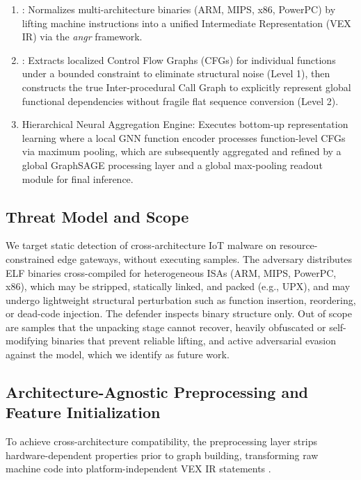 \documentclass[conference]{IEEEtran}
\begin{document}
\begin{enumerate}
    \item {}: Normalizes multi-architecture binaries (ARM, MIPS, x86, PowerPC) by lifting machine instructions into a unified Intermediate Representation (VEX IR) via the \textit{angr} framework.
    \item {}: Extracts localized Control Flow Graphs (CFGs) for individual functions under a bounded constraint to eliminate structural noise \cite{b6} (Level 1), then constructs the true Inter-procedural Call Graph to explicitly represent global functional dependencies without fragile flat sequence conversion (Level 2).
    \item Hierarchical Neural Aggregation Engine: Executes bottom-up representation learning where a local GNN function encoder processes function-level CFGs via maximum pooling, which are subsequently aggregated and refined by a global GraphSAGE processing layer and a global max-pooling readout module for final inference.
\end{enumerate}


\subsection{Threat Model and Scope}
We target static detection of cross-architecture IoT malware on resource-constrained edge gateways,
without executing samples. The adversary distributes ELF binaries cross-compiled for heterogeneous
ISAs (ARM, MIPS, PowerPC, x86), which may be stripped, statically linked, and packed (e.g., UPX), and
may undergo lightweight structural perturbation such as function insertion, reordering, or dead-code
injection. The defender inspects binary structure only. Out of scope are samples that the unpacking
stage cannot recover, heavily obfuscated or self-modifying binaries that prevent reliable lifting, and
active adversarial evasion against the model, which we identify as future work.


\subsection{Architecture-Agnostic Preprocessing and Feature Initialization}
To achieve cross-architecture compatibility, the preprocessing layer strips hardware-dependent properties prior to graph building, transforming raw machine code into platform-independent VEX IR statements \cite{b4}.
\end{document}
